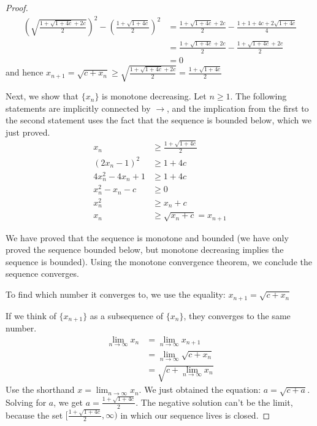 \documentclass{article}
\begin{document}
\begin{enumerate}
\begin{proof}
    \begin{equation*}
      \begin{split}
        (\sqrt{\frac{1+\sqrt{1+4c}+2c}{2}})^2 -
        (\frac{1+\sqrt{1+4c}}{2})^2 &= \frac{1 + \sqrt{1+4c}+2c}{2} -
        \frac{1+1+4c+2\sqrt{1+4c}}{4}
        \\
        &= \frac{1 + \sqrt{1+4c}+2c}{2} - \frac{1 + \sqrt{1+4c}+2c}{2}\\
        &= 0
      \end{split}
    \end{equation*}
    and hence $x_{n+1} =
    \sqrt{c+x_n} \geq \sqrt{\frac{1+\sqrt{1+4c}+2c}{2}} =
    \frac{1+\sqrt{1+4c}}{2}$

    Next, we show that $\{x_n\}$ is monotone decreasing.
    Let $n \geq 1$. The following statements are implicitly connected
    by $\rightarrow$, and the implication from the first to the second
    statement uses the fact that the sequence is bounded below, which
    we just proved.
    \begin{equation*}
      \begin{split}
        x_{n} &\geq \frac{1+\sqrt{1+4c}}{2}\\
        (2x_{n}-1)^2 &\geq 1 + 4c\\
        4x_{n}^2 - 4x_{n} + 1 &\geq 1 + 4c\\
        x_{n}^2-x_{n} -c &\geq 0\\
        x_{n}^2 &\geq x_{n} + c\\
        x_{n} &\geq \sqrt{x_{n} + c} = x_{n+1}
      \end{split}
    \end{equation*}

    We have proved that the sequence is monotone and bounded (we have
    only proved the sequence bounded below, but monotone decreasing
    implies the sequence is bounded). Using the monotone convergence
    theorem, we conclude the sequence converges.

    To find which number it converges to, we use the equality:
    $x_{n+1} = \sqrt{c + x_n}$

    If we think of $\{x_{n+1}\}$ as a subsequence of $\{x_n\}$, they
    converges to the same number.
    \begin{equation*}
      \begin{split}
        \lim_{n \rightarrow \infty} x_{n} &= \lim_{n \rightarrow \infty}
        x_{n+1}\\
        &= \lim_{n \rightarrow \infty} \sqrt{c +x_n}\\
        &= \sqrt{c + \lim_{n \rightarrow \infty}x_n}
      \end{split}
    \end{equation*}
    Use the shorthand $x=\lim_{n \rightarrow \infty} x_{n}$. We just
    obtained the equation: $a = \sqrt{c + a}$. Solving for $a$, we get
    $a = \frac{1+\sqrt{1+4c}}{2}$. The negative solution can't be the
    limit, because the set $[\frac{1+\sqrt{1+4c}}{2},\infty)$ in which
    our sequence lives is closed.


\end{proof}
\end{enumerate}
\end{document}
